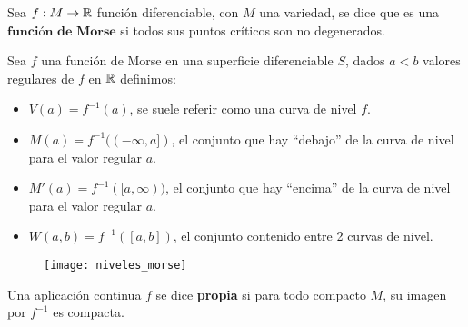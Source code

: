 \begin{definicion} Sea $f:M \to \mathbb{R}$ función diferenciable, con $M$ una variedad, se dice que es una $\textbf{función de Morse}$ si todos sus puntos críticos son no degenerados.
\end{definicion}

\newpage
\begin{definicion} Sea $f$ una función de Morse en una superficie diferenciable $S$, dados $a < b$ valores regulares de $f$ en $\mathbb{R}$ definimos:
	\begin{itemize}
		\item $V(a) = f^{-1}(a)$, se suele referir como una curva de nivel $f$.
		\item $M(a) = f^{-1}((-\infty, a])$, el conjunto que hay ``debajo'' de la curva de nivel para el valor regular $a$.
		\item $M'(a) = f^{-1}([a,\infty))$, el conjunto que hay ``encima'' de la curva de nivel para el valor regular $a$.
		\item $W(a,b) = f^{-1}([a,b])$, el conjunto contenido entre 2 curvas de nivel.
	\end{itemize}
\end{definicion}

\begin{figure}[h]
  	\centering
  	\texttt{[image: niveles\_morse]}
  	\label{fig:niveles_morse}
\end{figure}

\begin{definicion} Una aplicación continua $f$ se dice \textbf{propia} si para todo compacto $M$, su imagen por $f^{-1}$ es compacta.
\end{definicion}

\endinput
